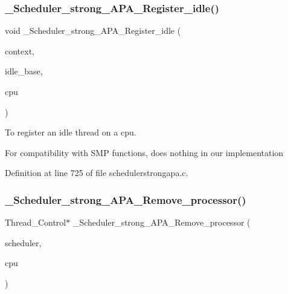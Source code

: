 \subsubsection{\texorpdfstring{\+\_\+\+Scheduler\+\_\+strong\+\_\+\+A\+P\+A\+\_\+\+Register\+\_\+idle()}{\_Scheduler\_strong\_APA\_Register\_idle()}}
{\footnotesize\ttfamily void \+\_\+\+Scheduler\+\_\+strong\+\_\+\+A\+P\+A\+\_\+\+Register\+\_\+idle (\begin{DoxyParamCaption}\item[{Scheduler\+\_\+\+Context $\ast$}]{context,  }\item[{Scheduler\+\_\+\+Node $\ast$}]{idle\+\_\+base,  }\item[{Per\+\_\+\+C\+P\+U\+\_\+\+Control $\ast$}]{cpu }\end{DoxyParamCaption})}



To register an idle thread on a cpu. 

For compatibility with S\+MP functions, does nothing in our implementation 

Definition at line 725 of file schedulerstrongapa.\+c.

\mbox{\label{group__RTEMSScoreSchedulerStrongAPA_ga91dc29dcdeea35e3329623be7a798e39}} 
\subsubsection{\texorpdfstring{\+\_\+\+Scheduler\+\_\+strong\+\_\+\+A\+P\+A\+\_\+\+Remove\+\_\+processor()}{\_Scheduler\_strong\_APA\_Remove\_processor()}}
{\footnotesize\ttfamily Thread\+\_\+\+Control$\ast$ \+\_\+\+Scheduler\+\_\+strong\+\_\+\+A\+P\+A\+\_\+\+Remove\+\_\+processor (\begin{DoxyParamCaption}\item[{const Scheduler\+\_\+\+Control $\ast$}]{scheduler,  }\item[{Per\+\_\+\+C\+P\+U\+\_\+\+Control $\ast$}]{cpu }\end{DoxyParamCaption})}



